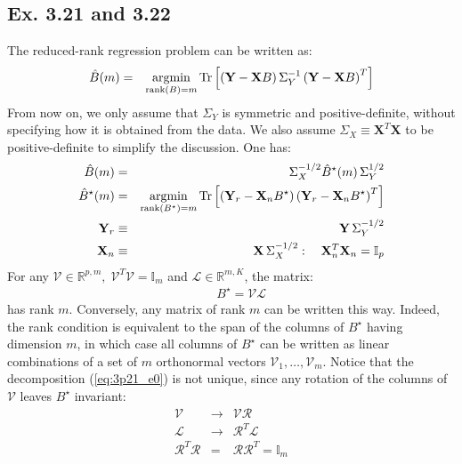 \subsection*{Ex. 3.21 and 3.22}
The reduced-rank regression problem can be written as:
\begin{eqnarray} \label{eq:3p21_def}
\hat{B}(m) & = & \operatorname*{argmin}_{\textrm{rank}(B) = m} \textrm{Tr} \left[  \left( \mathbf{Y} - \mathbf{X} B \right) \Sigma_Y ^{-1} \left( \mathbf{Y} - \mathbf{X} B \right) ^T \right]
\end{eqnarray}
From now on, we only assume that $\Sigma_Y$ is symmetric and positive-definite, without specifying how it is obtained from the data. We also assume $\Sigma_X \equiv \mathbf{X}^T \mathbf{X}$ to be positive-definite to simplify the discussion. One has:
\begin{eqnarray*}
\hat{B}(m) & = & \Sigma_X ^{-1/2} \hat{B} ^{\star}(m)\, \Sigma_Y^{1/2} \\
\hat{B} ^{\star}(m) & = & \operatorname*{argmin}_{\textrm{rank}(B ^{\star}) = m} \textrm{Tr} \left[  \left( \mathbf{Y}_r - \mathbf{X}_n B ^{\star} \right) \left( \mathbf{Y}_r - \mathbf{X}_n B ^{\star} \right) ^T \right]\\
\mathbf{Y}_r & \equiv & \mathbf{Y}\, \Sigma_Y ^{-1/2}\\
\mathbf{X}_n & \equiv & \mathbf{X}\, \Sigma_X ^{-1/2}: \quad \mathbf{X}_n^T \mathbf{X}_n = \mathbb{I}_p
\end{eqnarray*}
For any $\mathcal{V} \in \mathbb{R}^{p, m}, \; \mathcal{V}^T \mathcal{V} = \mathbb{I}_m$ and $\mathcal{L} \in \mathbb{R}^{m, K}$, the matrix:
\begin{eqnarray} \label{eq:3p21_e0}
&&B ^{\star}  =  \mathcal{V} \mathcal{L}
\end{eqnarray}
has rank $m$. Conversely, any matrix of rank $m$ can be written this way. Indeed, the rank condition is equivalent to the span of the columns of $B ^{\star}$ having dimension $m$, in which case all columns of $B ^{\star}$ can be written as linear combinations of a set of $m$ orthonormal vectors $\mathcal{V}_1, \ldots, \mathcal{V}_m$. Notice that the decomposition (\ref{eq:3p21_e0}) is not unique, since any rotation of the columns of $\mathcal{V}$ leaves $B ^{\star}$ invariant:
\begin{eqnarray}
\mathcal{V} & \rightarrow & \mathcal{V} \mathcal{R}\\
\mathcal{L} & \rightarrow & \mathcal{R}^T \mathcal{L}\\
\mathcal{R} ^T  \mathcal{R} & = &  \mathcal{R}  \mathcal{R} ^T = \mathbb{I}_m
\end{eqnarray}
